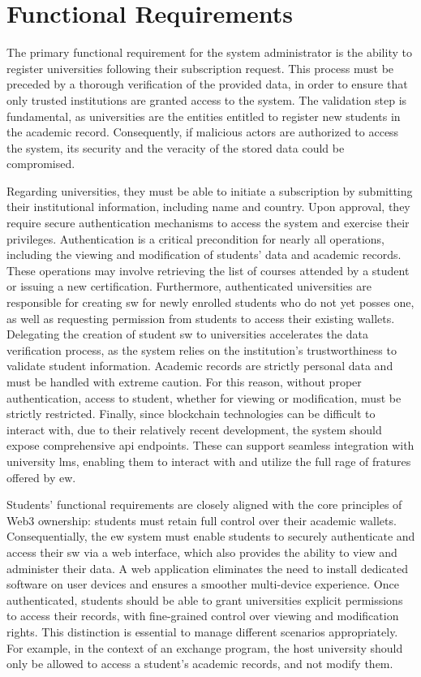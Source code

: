 \section{Functional Requirements}
The primary functional requirement for the system administrator is the ability to register universities following their subscription request. This process must be preceded by a thorough verification of the provided data, in order to ensure that only trusted institutions are granted access to the system. The validation step is fundamental, as universities are the entities entitled to register new students in the academic record. Consequently, if malicious actors are authorized to access the system, its security and the veracity of the stored data could be compromised.

Regarding universities, they must be able to initiate a subscription by submitting their institutional information, including name and country. Upon approval, they require secure authentication mechanisms to access the system and exercise their privileges. Authentication is a critical precondition for nearly all operations, including the viewing and modification of students' data and academic records. These operations may involve retrieving the list of courses attended by a student or issuing a new certification. Furthermore, authenticated universities are responsible for creating \acrfull{sw} for newly enrolled students who do not yet posses one, as well as requesting permission from students to access their existing wallets. Delegating the creation of student \acrshort{sw} to universities accelerates the data verification process, as the system relies on the institution's trustworthiness to validate student information. Academic records are strictly personal data and must be handled with extreme caution. For this reason, without proper authentication, access to student, whether for viewing or modification, must be strictly restricted. 
Finally, since blockchain technologies can be difficult to interact with, due to their relatively recent development, the system should expose comprehensive \acrfull{api} endpoints. These can support seamless integration with university \acrfull{lms}, enabling them to interact with and utilize the full rage of fratures offered by \acrlong{ew}.

Students' functional requirements are closely aligned with the core principles of Web3 ownership: students must retain full control over their academic wallets. Consequentially, the \acrshort{ew} system must enable students to securely authenticate and access their \acrshort{sw} via a web interface, which also provides the ability to view and administer their data. A web application eliminates the need to install dedicated software on user devices and ensures a smoother multi-device experience.
Once authenticated, students should be able to grant universities explicit permissions to access their records, with fine-grained control over viewing and modification rights. This distinction is essential to manage different scenarios appropriately. For example, in the context of an exchange program, the host university should only be allowed to access a student's academic records, and not modify them.


